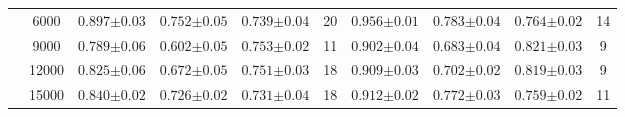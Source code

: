 \begin{table}[hbtp]
\begin{tabularx}{\textwidth}{cc | YYYc | YYYc }
        & 6000 & $0.897{\scriptscriptstyle\pm0.03}$ & $0.752{\scriptscriptstyle\pm0.05}$ & $0.739{\scriptscriptstyle\pm0.04}$ & 20 & $0.956{\scriptscriptstyle\pm0.01}$ & $0.783{\scriptscriptstyle\pm0.04}$ & $0.764{\scriptscriptstyle\pm0.02}$ & 14\\
        & 9000 & $0.789{\scriptscriptstyle\pm0.06}$ & $0.602{\scriptscriptstyle\pm0.05}$ & $0.753{\scriptscriptstyle\pm0.02}$ & 11 & $0.902{\scriptscriptstyle\pm0.04}$ & $0.683{\scriptscriptstyle\pm0.04}$ & $0.821{\scriptscriptstyle\pm0.03}$ & 9\\
        & 12000 & $0.825{\scriptscriptstyle\pm0.06}$ & $0.672{\scriptscriptstyle\pm0.05}$ & $0.751{\scriptscriptstyle\pm0.03}$ & 18 & $0.909{\scriptscriptstyle\pm0.03}$ & $0.702{\scriptscriptstyle\pm0.02}$ & $0.819{\scriptscriptstyle\pm0.03}$ & 9\\
        & 15000 & $0.840{\scriptscriptstyle\pm0.02}$ & $0.726{\scriptscriptstyle\pm0.02}$ & $0.731{\scriptscriptstyle\pm0.04}$ & 18 & $0.912{\scriptscriptstyle\pm0.02}$ & $0.772{\scriptscriptstyle\pm0.03}$ & $0.759{\scriptscriptstyle\pm0.02}$ & 11\\


\end{tabularx}
\end{table}

